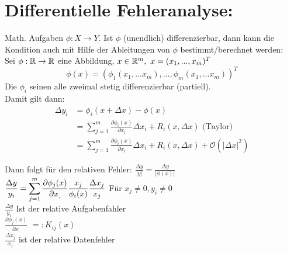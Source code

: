 \documentclass[../Skript.tex]{subfiles}
\begin{document}
\section{Differentielle Fehleranalyse:}
Math. Aufgaben $\phi : X \to Y$. Ist $\phi$ (unendlich) differenzierbar, dann kann die Kondition auch mit Hilfe der Ableitungen von $\phi$ bestimmt/berechnet werden:\\
Sei $\phi : \mathbb{R} \to \mathbb{R}$ eine Abbildung, $ x\in\mathbb{R}^m,\ x=(x_1,...,x_m)^T$ \\
    $$\phi(x)=(\phi_1(x_1,...x_m),...,\phi_m(x_1,...x_m))^T$$
    Die $\phi_i$ seinen alle zweimal stetig differenzierbar (partiell).\\
    Damit gilt dann:  \begin{align*}\Delta y_i&=\phi_i(x+\Delta x)-\phi(x)\\
                    &=\sum^m_{j=1}\frac{\partial\phi_i(x)}{\partial x_i}\Delta x_i + R_i(x,\Delta x) \text{ (Taylor)}\\
                    &=\sum^m_{j=1}\frac{\partial\phi_i(x)}{\partial x_i}\Delta x_i + R_i(x,\Delta x) + \mathcal{O}(|\Delta x|^2)
                    \end{align*}

Dann folgt für den relativen Fehler: $\frac{\Delta y}{|y|}=\frac{\Delta y}{|\phi(x)|}$ \\

$\displaystyle\frac{\Delta y}{y_i} = \displaystyle\sum^m_{j=1}\frac{\partial\phi_j(x)}{\partial x_,}\frac{x_j}{\phi_i(x)}\frac{\Delta x_j}{x_j}$ Für $x_j\neq 0 , y_i\neq 0$\\
$\displaystyle\frac{\Delta y}{y_i}$ Ist der relative Aufgabenfahler\\
$\displaystyle\frac{\partial\phi_j(x)}{\partial x_,}$  $=: K_{ij}(x)$\\
$\displaystyle\frac{\Delta x_j}{x_j}$ ist der relative Datenfehler\\
\end{document}
